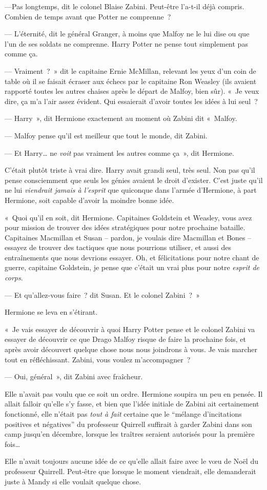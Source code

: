 ---Pas longtemps, dit le colonel Blaise Zabini. Peut-être l'a-t-il déjà compris. Combien de temps avant que Potter ne comprenne~?

--- L'éternité, dit le général Granger, à moins que Malfoy ne le lui dise ou que l'un de ses soldats ne comprenne. Harry Potter ne pense tout simplement pas comme ça.

--- Vraiment~?~» dit le capitaine Ernie McMillan, relevant les yeux d'un coin de table où il se faisait écraser aux échecs par le capitaine Ron Weasley (ils avaient rapporté toutes les autres chaises après le départ de Malfoy, bien sûr). «~Je veux dire, ça m'a l'air assez évident. Qui essaierait d'avoir toutes les idées à lui seul~?

--- Harry~», dit Hermione exactement au moment où Zabini dit «~Malfoy.

--- Malfoy pense qu'il est meilleur que tout le monde, dit Zabini.

--- Et Harry… ne \emph{voit} pas vraiment les autres comme ça~», dit Hermione.

C'était plutôt triste à vrai dire. Harry avait grandi seul, très seul. Non pas qu'il pense consciemment que seuls les génies avaient le droit d'exister. C'est juste qu'il ne lui \emph{viendrait jamais à l'esprit} que quiconque dans l'armée d'Hermione, à part Hermione, soit capable d'avoir la moindre bonne idée.

«~Quoi qu'il en soit, dit Hermione. Capitaines Goldstein et Weasley, vous avez pour mission de trouver des idées stratégiques pour notre prochaine bataille. Capitaines Macmillan et Susan -- pardon, je voulais dire Macmillan et Bones -- essayez de trouver des tactiques que nous pourrions utiliser, et aussi des entraînements que nous devrions essayer. Oh, et félicitations pour notre chant de guerre, capitaine Goldstein, je pense que c'était un vrai plus pour notre \emph{esprit de corps}.

--- Et qu'allez-vous faire~? dit Susan. Et le colonel Zabini~?~»

Hermione se leva en s'étirant.

«~Je vais essayer de découvrir à quoi Harry Potter pense et le colonel Zabini va essayer de découvrir ce que Drago Malfoy risque de faire la prochaine fois, et après avoir découvert quelque chose nous nous joindrons à vous. Je vais marcher tout en réfléchissant. Zabini, vous voulez m'accompagner~?

--- Oui, général~», dit Zabini avec fraîcheur.

Elle n'avait pas voulu que ce soit un ordre. Hermione soupira un peu en pensée. Il allait falloir qu'elle s'y fasse, et bien que l'idée initiale de Zabini ait certainement fonctionné, elle n'était pas \emph{tout à fait} certaine que le “mélange d'incitations positives et négatives” du professeur Quirrell suffirait à garder Zabini dans son camp jusqu'en décembre, lorsque les traîtres seraient autorisés pour la première fois…

Elle n'avait toujours aucune idée de ce qu'elle allait faire avec le vœu de Noël du professeur Quirrell. Peut-être que lorsque le moment viendrait, elle demanderait juste à Mandy si elle voulait quelque chose.~
